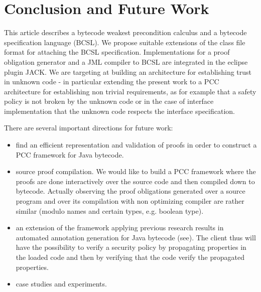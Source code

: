 \section{Conclusion and Future Work}\label{conclusion}
This article describes a bytecode weakest precondition calculus and a bytecode specification language (BCSL). We propose suitable extensions of the class file format for
attaching the BCSL specification. Implementations for a proof obligation generator and a JML compiler to BCSL are integrated in the eclipse plugin JACK. We are targeting at building an architecture for establishing trust in unknown code - in particular extending the present work to a PCC architecture for establishing non trivial requirements, as for example that a safety policy is not broken by the unknown code or in the case of interface implementation that the unknown code respects the interface specification.  


There are several important directions for future work:
\begin{itemize}
\item find an efficient representation and validation of proofs in order to construct a PCC framework for Java bytecode. 
\item source proof compilation. We would like to build a PCC framework where the proofs are done interactively over the source code
and then compiled down to bytecode. Actually observing the proof obligations generated over a source program and over its compilation with non optimizing compiler are
rather similar (modulo names and certain types, e.g. boolean type).
\item an extension of the framework applying previous research results in automated annotation generation for Java bytecode (see\cite{PBBHL}). The client thus will have the possibility to verify a security policy by propagating properties in the loaded code and then by verifying that the code verify the propagated properties.

\item case studies and experiments.
\end{itemize}

